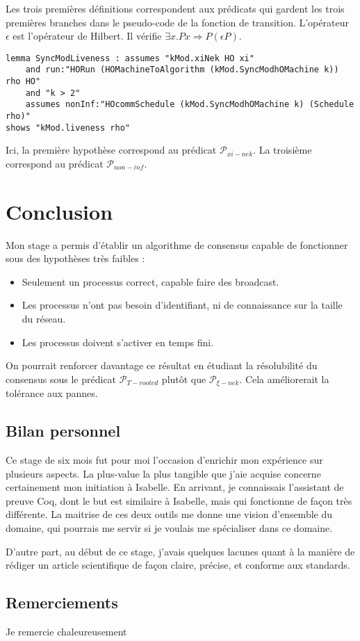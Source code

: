 \documentclass{article}
\begin{document}
Les trois premières définitions correspondent aux prédicats qui gardent les trois premières branches dans le pseudo-code de la fonction de transition.
L'opérateur $\epsilon$ est l'opérateur de Hilbert. Il vérifie $\exists x. P x \Rightarrow P (\epsilon P)$.

\begin{lstlisting}
lemma SyncModLiveness : assumes "kMod.xiNek HO xi"
	and run:"HORun (HOMachineToAlgorithm (kMod.SyncModhOMachine k)) rho HO"
	and "k > 2"
	assumes nonInf:"HOcommSchedule (kMod.SyncModhOMachine k) (Schedule rho)"
shows "kMod.liveness rho"
\end{lstlisting}

Ici, la première hypothèse correspond au prédicat $\mathcal{P}_{xi-nek}$. La troisième correspond au prédicat $\mathcal{P}_{non-inf}$.

\section{Conclusion}

Mon stage a permis d'établir un algorithme de consensus capable de fonctionner sous des hypothèses très faibles :
\begin{itemize}
	\item Seulement un processus correct, capable faire des broadcast.
	\item Les processus n'ont pas besoin d'identifiant, ni de connaissance sur la taille du réseau.
	\item Les processus doivent s'activer en temps fini.
\end{itemize}

On pourrait renforcer davantage ce résultat en étudiant la résolubilité du consensus sous le prédicat $\mathcal{P}_{T-rooted}$ plutôt que $\mathcal{P}_{\xi-nek}$.
Cela améliorerait la tolérance aux pannes.

\subsection{Bilan personnel}

Ce stage de six mois fut pour moi l'occasion d'enrichir mon expérience sur plusieurs aspects.
La plus-value la plus tangible que j'aie acquise concerne certainement mon initiation à Isabelle. En arrivant, je connaissais l'assistant de preuve Coq, dont le but est similaire à Isabelle,
mais qui fonctionne de façon très différente. La maitrise de ces deux outils me donne une vision d'ensemble du domaine, qui pourrais me servir si je voulais me spécialiser dans ce domaine.

D'autre part, au début de ce stage, j'avais quelques lacunes quant à la manière de rédiger un article scientifique de façon claire, précise, et conforme aux standards.

\subsection{Remerciements}

Je remercie chaleureusement 

\printbibliography
\end{document}
